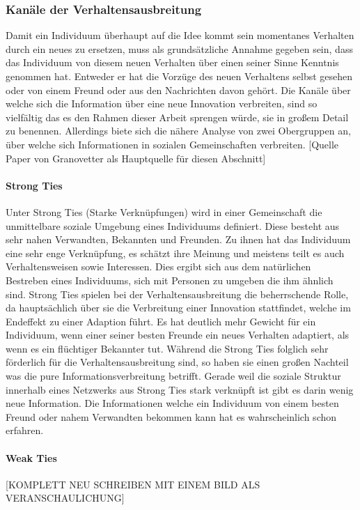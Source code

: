 \documentclass[12pt]{article}
\begin{document}
\subsubsection{Kanäle der Verhaltensausbreitung}
\label{intro_ties}
Damit ein Individuum überhaupt auf die Idee kommt sein momentanes Verhalten durch ein neues zu ersetzen, muss als grundsätzliche Annahme gegeben sein, dass das Individuum von diesem neuen Verhalten über einen seiner Sinne Kenntnis genommen hat. Entweder er hat die Vorzüge des neuen Verhaltens selbst gesehen oder von einem Freund oder aus den Nachrichten davon gehört. Die Kanäle über welche sich die Information über eine neue Innovation verbreiten, sind so vielfältig das es den Rahmen dieser Arbeit sprengen würde, sie in großem Detail zu benennen. Allerdings biete sich die nähere Analyse von zwei Obergruppen an, über welche sich Informationen in sozialen Gemeinschaften verbreiten.
[Quelle Paper von Granovetter als Hauptquelle für diesen Abschnitt]
\paragraph{Strong Ties}
Unter Strong Ties (Starke Verknüpfungen) wird in einer Gemeinschaft die unmittelbare soziale Umgebung eines Individuums definiert. Diese besteht aus sehr nahen Verwandten, Bekannten und Freunden. Zu ihnen hat das Individuum eine sehr enge Verknüpfung, es schätzt ihre Meinung und meistens teilt es auch Verhaltensweisen sowie Interessen. Dies ergibt sich aus dem natürlichen Bestreben eines Individuums, sich mit Personen zu umgeben die ihm ähnlich sind. Strong Ties spielen bei der Verhaltensausbreitung die beherrschende Rolle, da hauptsächlich über sie die Verbreitung einer Innovation stattfindet, welche im Endeffekt zu einer Adaption führt. Es hat deutlich mehr Gewicht für ein Individuum, wenn einer seiner besten Freunde ein neues Verhalten adaptiert, als wenn es ein flüchtiger Bekannter tut. Während die Strong Ties folglich sehr förderlich für die Verhaltensausbreitung sind, so haben sie einen großen Nachteil was die pure Informationsverbreitung betrifft. Gerade weil die soziale Struktur innerhalb eines Netzwerks aus Strong Ties stark verknüpft ist gibt es darin wenig neue Information. Die Informationen welche ein Individuum von einem besten Freund oder nahem Verwandten bekommen kann hat es wahrscheinlich schon erfahren.
\paragraph{Weak Ties}
[KOMPLETT NEU SCHREIBEN MIT EINEM BILD ALS VERANSCHAULICHUNG]
\end{document}
